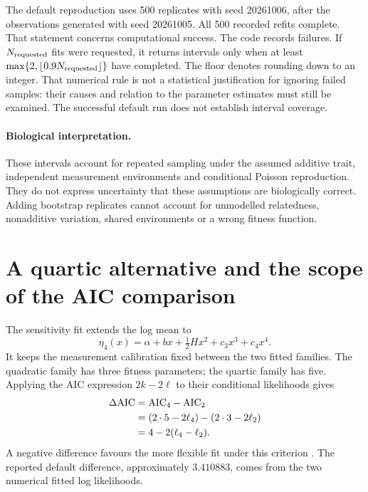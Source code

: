 The default reproduction uses 500 replicates with seed 20261006, after the
observations generated with seed 20261005. All 500 recorded refits complete.
That statement concerns computational success. The code records failures.
If \(N_{\rm requested}\) fits were requested, it returns intervals only when
at least \(\max\{2,\lfloor0.9N_{\rm requested}\rfloor\}\) have completed.
The floor denotes rounding down to an integer. That numerical rule is not a
statistical justification
for ignoring failed samples: their causes and relation to the parameter
estimates must still be examined. The successful default run does not
establish interval coverage.

\paragraph{Biological interpretation.}
These intervals account for repeated sampling under the assumed additive
trait, independent measurement environments and conditional Poisson
reproduction. They do not express uncertainty that these assumptions are
biologically correct. Adding bootstrap replicates cannot account for
unmodelled relatedness, nonadditive variation, shared environments or a wrong
fitness function.

\section{A quartic alternative and the scope of the AIC comparison}
\label{estimation:aic}

The sensitivity fit extends the log mean to
\begin{equation}
 \eta_4(x)=\alpha+bx+\tfrac12Hx^2+c_3x^3+c_4x^4.
 \label{estimation:quartic_fit}
\end{equation}
It keeps the measurement calibration fixed between the two fitted families.
The quadratic family has three fitness parameters; the quartic family has
five. Applying the AIC expression \(2k-2\ell\) to their conditional
likelihoods gives
\begin{align}
 \Delta{\rm AIC}
 &={\rm AIC}_4-{\rm AIC}_2\nonumber\\
 &=(2\cdot5-2\ell_4)-(2\cdot3-2\ell_2)\nonumber\\
 &=4-2(\ell_4-\ell_2).
 \label{estimation:aic_difference}
\end{align}
A negative difference favours the more flexible fit under this criterion
\citep{Akaike1974}. The reported default difference, approximately \(3.410883\),
comes from the two numerical fitted log likelihoods.

